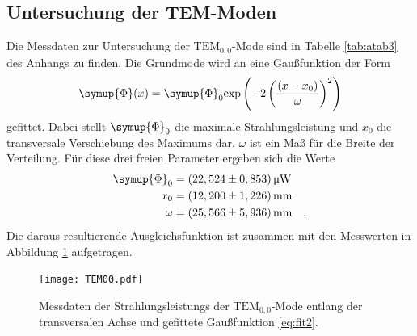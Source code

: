 \subsection{Untersuchung der TEM-Moden}
Die Messdaten zur Untersuchung der $\text{TEM}_{0,0}$-Mode sind in Tabelle \ref{tab:atab3} des Anhangs zu finden. 
Die Grundmode wird an eine Gaußfunktion der Form
\begin{equation}
\symup{\Phi}(x) = \symup{\Phi}_0 \text{exp}\left(-2\left(\frac{(x-x_0)}{\omega}\right)^2\right) \label{eq:fit2}
\end{equation}
gefittet. 
Dabei stellt $\symup{\Phi}_0$ die maximale Strahlungsleistung und $x_0$ die transversale Verschiebung des Maximums dar. 
$\omega$ ist ein Maß für die Breite der Verteilung. 
Für diese drei freien Parameter ergeben sich die Werte
\begin{align}
\symup{\Phi}_0 &= (22,524 \pm 0,853)\,\si{\micro\watt} \\
x_0 &= (12,200 \pm 1,226)\,\si{\mm}\\
\omega &= (25,566\pm5,936)\,\si{\mm} \quad .
\end{align}
Die daraus resultierende Ausgleichsfunktion ist zusammen mit den Messwerten in Abbildung \ref{fig:afig3} aufgetragen.
\noindent
\FloatBarrier
\begin{figure}[h]
\centering
\texttt{[image: TEM00.pdf]}
\caption{Messdaten der Strahlungsleistungs der $\text{TEM}_{0,0}$-Mode entlang der transversalen Achse und gefittete Gaußfunktion \eqref{eq:fit2}.}
\label{fig:afig3}
\end{figure}
\FloatBarrier

